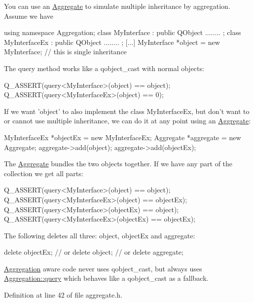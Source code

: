 \-You can use an \hyperlink{class_aggregation_1_1_aggregate}{\-Aggregate} to simulate multiple inheritance by aggregation. \-Assume we have 
\begin{DoxyCode}
        using namespace Aggregation;
        class MyInterface : public QObject { ........ };
        class MyInterfaceEx : public QObject { ........ };
        [...]
        MyInterface *object = new MyInterface; // this is single inheritance
\end{DoxyCode}
 \-The query method works like a qobject\-\_\-cast with normal objects\-: 
\begin{DoxyCode}
        Q_ASSERT(query<MyInterface>(object) == object);
        Q_ASSERT(query<MyInterfaceEx>(object) == 0);
\end{DoxyCode}
 \-If we want 'object' to also implement the class \-My\-Interface\-Ex, but don't want to or cannot use multiple inheritance, we can do it at any point using an \hyperlink{class_aggregation_1_1_aggregate}{\-Aggregate}\-: 
\begin{DoxyCode}
        MyInterfaceEx *objectEx = new MyInterfaceEx;
        Aggregate *aggregate = new Aggregate;
        aggregate->add(object);
        aggregate->add(objectEx);
\end{DoxyCode}
 \-The \hyperlink{class_aggregation_1_1_aggregate}{\-Aggregate} bundles the two objects together. \-If we have any part of the collection we get all parts\-: 
\begin{DoxyCode}
        Q_ASSERT(query<MyInterface>(object) == object);
        Q_ASSERT(query<MyInterfaceEx>(object) == objectEx);
        Q_ASSERT(query<MyInterface>(objectEx) == object);
        Q_ASSERT(query<MyInterfaceEx>(objectEx) == objectEx);
\end{DoxyCode}
 \-The following deletes all three\-: object, object\-Ex and aggregate\-: 
\begin{DoxyCode}
        delete objectEx;
        // or delete object;
        // or delete aggregate;
\end{DoxyCode}


\hyperlink{namespace_aggregation}{\-Aggregation} aware code never uses qobject\-\_\-cast, but always uses \hyperlink{namespace_aggregation_a1b5f85f4af221459c037427c41e18d98}{\-Aggregation\-::query} which behaves like a qobject\-\_\-cast as a fallback. 

\-Definition at line 42 of file aggregate.\-h.



